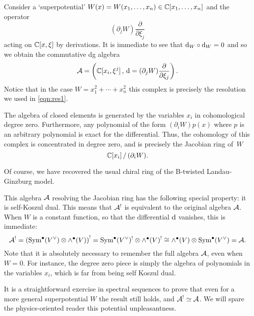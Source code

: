 \documentclass[11pt]{amsart}
\begin{document}
Consider a `superpotential' $W(x) = W(x_1,\ldots, x_n) \in \mathbb C[x_1,\ldots, x_n]$ and the operator 
\[
(\partial_j W) \frac{\partial}{\partial \xi_j}
\]
acting on $\mathbb C[x,\xi]$ by derivations. 
It is immediate to see that ${\rm d}_W \circ {\rm d}_W = 0$ and so we obtain the commutative dg algebra 
\[
\mathcal A = \left(\mathbb C[x_i, \xi^j] \, , \, {\rm d} = (\partial_j W) \frac{\partial}{\partial \xi_j} \right).
\]
Notice that in the case $W = x_1^2 + \cdots + x_n^2$ this complex is precisely the resolution we used in \eqref{eqn:res1}. 

The algebra of closed elements is generated by the variables $x_i$ in cohomological degree zero. 
Furthermore, any polynomial of the form $(\partial_i W) p(x)$ where $p$ is an arbitrary polynomial is exact for the differential. 
Thus, the cohomology of this complex is concentrated in degree zero, and is precisely the Jacobian ring of~$W$
\[
\mathbb C[x_i] \, / \, (\partial_i W) .
\]

Of course, we have recovered the usual chiral ring of the B-twisted Landau-Ginzburg model. 

This algebra $\mathcal A$ resolving the Jacobian ring has the following special property: it is self-Koszul dual. 
This means that $\mathcal A^!$ is equivalent to the original algebra $\mathcal A$. 
When $W$ is a constant function, so that the differential ${\rm d}$ vanishes, this is immediate:
\[
\mathcal A^! = \left(\operatorname{Sym}^\bullet (V^\vee) \otimes \wedge^\bullet(V)\right)^! = \operatorname{Sym}^\bullet (V^\vee)^! \otimes \wedge^\bullet(V)^! \cong \wedge^\bullet (V) \otimes \operatorname{Sym}^\bullet (V^\vee) = \mathcal A .
\]
Note that it is absolutely necessary to remember the full algebra $\mathcal A$, even when $W = 0$. 
For instance, the degree zero piece is simply the algebra of polynomials in the variables $x_i$, which is far from being self Koszul dual.

It is a straightforward exercise in spectral sequences to prove that even for a more general superpotential $W$ the result still holds, and $\mathcal A^! \simeq \mathcal A$. We will spare the physics-oriented reader this potential unpleasantness. 



\end{document}
